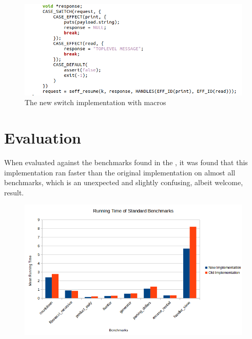 \documentclass[logo,bsc,singlespacing,parskip,online]{infthesis}
\begin{document}
\begin{figure}[h]
    \centering
    \includegraphics[width=1\linewidth]{newswitch.png}
    \caption{The new switch implementation with macros}
    \label{fig:newswitch}
\end{figure}







\chapter{Evaluation}

When evaluated against the benchmarks found in the , it was found that this implementation ran faster than the original implementation on almost all benchmarks, which is an unexpected and slightly confusing, albeit welcome, result. 

\begin{figure}[h]
    \centering
    \includegraphics[width=1\linewidth]{bench_tests.PNG}
    \label{fig:benches}
\end{figure}
\end{document}
